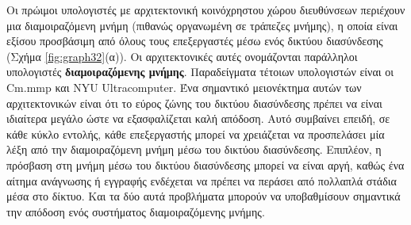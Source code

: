 \documentclass[12pt,a4paper]{article}
\begin{document}
Οι πρώιμοι υπολογιστές με αρχιτεκτονική κοινόχρηστου χώρου διευθύνσεων 
περιέχουν μια διαμοιραζόμενη μνήμη (πιθανώς οργανωμένη σε τράπεζες μνήμης), 
η οποία είναι εξίσου προσβάσιμη από όλους τους επεξεργαστές μέσω ενός 
δικτύου διασύνδεσης {(}Σχήμα \ref{fig:graph32}(α){)}. Οι αρχιτεκτονικές αυτές ονομάζονται 
παράλληλοι υπολογιστές \textbf{διαμοιραζόμενης μνήμης}. Παραδείγματα τέτοιων 
υπολογιστών είναι οι \foreignlanguage{english}{Cm.mmp} και \foreignlanguage{english}{NYU Ultracomputer}. Ένα σημαντικό 
μειονέκτημα αυτών των αρχιτεκτονικών είναι ότι το εύρος ζώνης του 
δικτύου διασύνδεσης πρέπει να είναι ιδιαίτερα μεγάλο ώστε να εξασφαλίζεται 
καλή απόδοση. Αυτό συμβαίνει επειδή, σε κάθε κύκλο εντολής, κάθε 
επεξεργαστής μπορεί να χρειάζεται να προσπελάσει μία λέξη από την 
διαμοιραζόμενη μνήμη μέσω του δικτύου διασύνδεσης. Επιπλέον, η πρόσβαση 
στη μνήμη μέσω του δικτύου διασύνδεσης μπορεί να είναι αργή, καθώς ένα 
αίτημα ανάγνωσης ή εγγραφής ενδέχεται να πρέπει να περάσει από πολλαπλά 
στάδια μέσα στο δίκτυο. Και τα δύο αυτά προβλήματα μπορούν να υποβαθμίσουν 
σημαντικά την απόδοση ενός συστήματος διαμοιραζόμενης μνήμης.  
\end{document}
